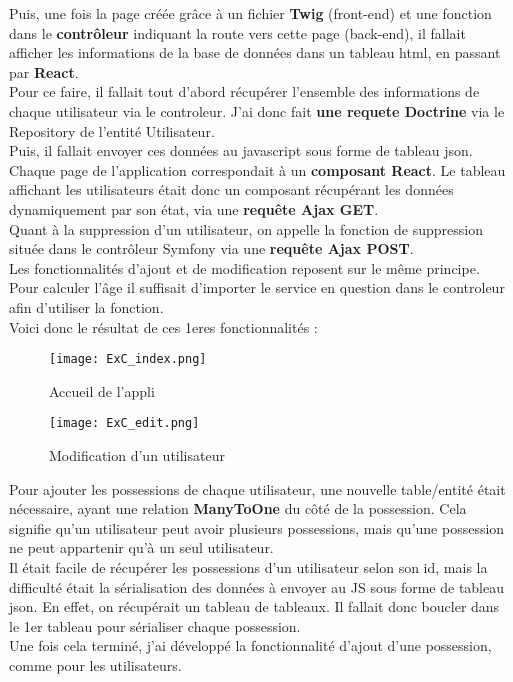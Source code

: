 Puis, une fois la page créée grâce à un fichier \textbf{Twig} (front-end) et une fonction dans le \textbf{contrôleur} indiquant la route vers cette page (back-end), il fallait afficher les informations de la base de données dans un tableau html, en passant par \textbf{React}.\\
Pour ce faire, il fallait tout d'abord récupérer l'ensemble des informations de chaque utilisateur via le controleur. J'ai donc fait \textbf{une requete Doctrine} via le Repository de l'entité Utilisateur.
\\Puis, il fallait envoyer ces données au javascript sous forme de tableau json. Chaque page de l'application correspondait à un \textbf{composant React}. 
Le tableau affichant les utilisateurs était donc un composant récupérant les données dynamiquement par son état, via une \textbf{requête Ajax GET}.\\
Quant à la suppression d'un utilisateur, on appelle la fonction de suppression située dans le contrôleur Symfony via une \textbf{requête Ajax POST}.\\
Les fonctionnalités d'ajout et de modification reposent sur le même principe.\\
Pour calculer l'âge il suffisait d'importer le service en question dans le controleur afin d'utiliser la fonction.\\
Voici donc le résultat de ces 1eres fonctionnalités :

\begin{figure}[H]
    \centering
    \texttt{[image: ExC\_index.png]}
    \caption{Accueil de l'appli}
\end{figure}

\begin{figure}[H]
    \centering
    \texttt{[image: ExC\_edit.png]}
    \caption{Modification d'un utilisateur}
\end{figure}



Pour ajouter les possessions de chaque utilisateur, une nouvelle table/entité était nécessaire, ayant une relation \textbf{ManyToOne} du côté de la possession. 
Cela signifie qu'un utilisateur peut avoir plusieurs possessions, mais qu'une possession ne peut appartenir qu'à un seul utilisateur. \\
Il était facile de récupérer les possessions d'un utilisateur selon son id, mais la difficulté était la sérialisation des données à envoyer au JS sous forme de tableau json.
En effet, on récupérait un tableau de tableaux. Il fallait donc boucler dans le 1er tableau pour sérialiser chaque possession.\\
Une fois cela terminé, j'ai développé la fonctionnalité d'ajout d'une possession, comme pour les utilisateurs.

